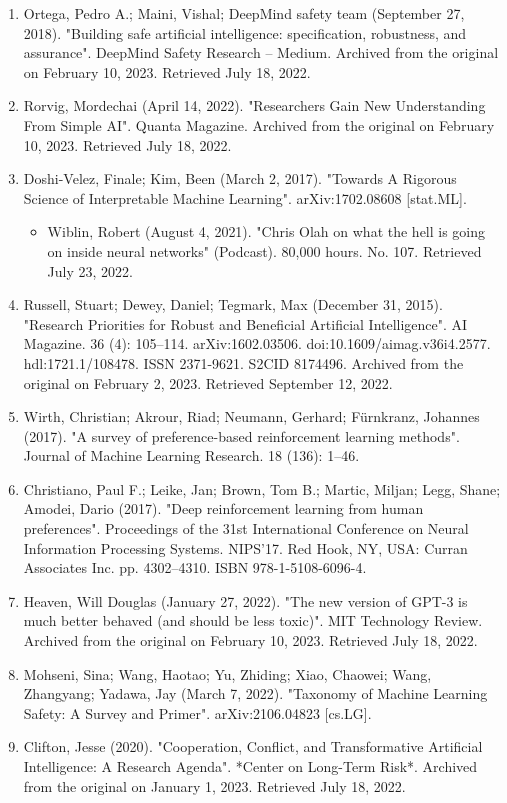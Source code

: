 \begin{enumerate}
\item Ortega, Pedro A.; Maini, Vishal; DeepMind safety team (September 27, 2018). "Building safe artificial intelligence: specification, robustness, and assurance". DeepMind Safety Research – Medium. Archived from the original on February 10, 2023. Retrieved July 18, 2022.
\item Rorvig, Mordechai (April 14, 2022). "Researchers Gain New Understanding From Simple AI". Quanta Magazine. Archived from the original on February 10, 2023. Retrieved July 18, 2022.
\item Doshi-Velez, Finale; Kim, Been (March 2, 2017). "Towards A Rigorous Science of Interpretable Machine Learning". arXiv:1702.08608 [stat.ML].
\begin{itemize}
\item Wiblin, Robert (August 4, 2021). "Chris Olah on what the hell is going on inside neural networks" (Podcast). 80,000 hours. No. 107. Retrieved July 23, 2022.
\end{itemize}
\item Russell, Stuart; Dewey, Daniel; Tegmark, Max (December 31, 2015). "Research Priorities for Robust and Beneficial Artificial Intelligence". AI Magazine. 36 (4): 105–114. arXiv:1602.03506. doi:10.1609/aimag.v36i4.2577. hdl:1721.1/108478. ISSN 2371-9621. S2CID 8174496. Archived from the original on February 2, 2023. Retrieved September 12, 2022.
\item Wirth, Christian; Akrour, Riad; Neumann, Gerhard; Fürnkranz, Johannes (2017). "A survey of preference-based reinforcement learning methods". Journal of Machine Learning Research. 18 (136): 1–46.
\item Christiano, Paul F.; Leike, Jan; Brown, Tom B.; Martic, Miljan; Legg, Shane; Amodei, Dario (2017). "Deep reinforcement learning from human preferences". Proceedings of the 31st International Conference on Neural Information Processing Systems. NIPS'17. Red Hook, NY, USA: Curran Associates Inc. pp. 4302–4310. ISBN 978-1-5108-6096-4.
\item Heaven, Will Douglas (January 27, 2022). "The new version of GPT-3 is much better behaved (and should be less toxic)". MIT Technology Review. Archived from the original on February 10, 2023. Retrieved July 18, 2022.
\item Mohseni, Sina; Wang, Haotao; Yu, Zhiding; Xiao, Chaowei; Wang, Zhangyang; Yadawa, Jay (March 7, 2022). "Taxonomy of Machine Learning Safety: A Survey and Primer". arXiv:2106.04823 [cs.LG].
\item Clifton, Jesse (2020). "Cooperation, Conflict, and Transformative Artificial Intelligence: A Research Agenda". *Center on Long-Term Risk*. Archived from the original on January 1, 2023. Retrieved July 18, 2022.

\end{enumerate}
